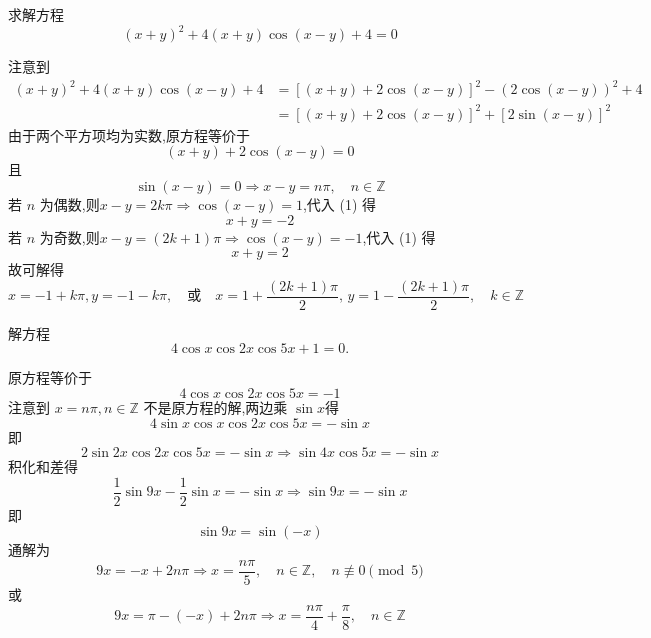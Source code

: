 \begin{questions}
    \question 求解方程
    \[
    (x+y)^2 + 4(x+y)\cos(x-y) + 4 = 0
    \]
    \begin{solution}
        注意到
        \begin{align*}
        (x+y)^2 + 4(x+y)\cos(x-y) + 4 &= \left[(x+y) + 2\cos(x-y)\right]^2 - (2\cos(x-y))^2 + 4 \\
        &= \left[(x+y) + 2\cos(x-y)\right]^2 + \left[2\sin(x-y)\right]^2
        \end{align*}
        由于两个平方项均为实数,原方程等价于
        \[
        (x+y) + 2\cos(x-y) = 0 \tag{1}
        \]
        且
        \[
        \sin(x-y) = 0 \Rightarrow x-y = n\pi, \quad n \in \mathbb{Z}
        \]
        若 $n$ 为偶数,则$x-y = 2k\pi \Rightarrow \cos(x-y) = 1$,代入 (1) 得
        \[
        x+y = -2
        \]
        若 $n$ 为奇数,则$x-y = (2k+1)\pi \Rightarrow \cos(x-y) = -1$,代入 (1) 得
        \[
        x+y = 2
        \]
        故可解得
        \[
        x = -1+k\pi,  y = -1-k\pi, \quad \text{或} \quad
        x = 1+\frac{(2k+1)\pi}{2}, \, y = 1-\frac{(2k+1)\pi}{2}, \quad k \in \mathbb{Z}
        \]
    \end{solution}

    \question 解方程
    \[
    4\cos x\cos 2x\cos 5x+1=0.
    \]
    \begin{solution}
        原方程等价于
        \[
        4\cos x\cos 2x\cos 5x=-1
        \]
        注意到 $x=n\pi,n\in\mathbb{Z}$ 不是原方程的解,两边乘 $\sin x$得
        \[
        4\sin x\cos x\cos 2x\cos 5x=-\sin x
        \]
        即
        \[
        2\sin 2x\cos 2x\cos 5x=-\sin x \Rightarrow \sin 4x\cos 5x=-\sin x
        \]
        积化和差得
        \[
        \frac12\sin 9x-\frac12\sin x=-\sin x \Rightarrow
        \sin 9x=-\sin x
        \]
        即
        \[
        \sin 9x=\sin(-x)
        \]
        通解为
        \[
        9x=-x+2n\pi \Rightarrow x=\frac{n\pi}{5}, \quad n\in\mathbb{Z}, \quad n \not\equiv 0 \pmod 5
        \]
        或
        \[
        9x=\pi-(-x)+2n\pi \Rightarrow x=\frac{n\pi}{4}+\frac{\pi}{8}, \quad n\in\mathbb{Z}
        \]
    \end{solution}


\end{questions}
